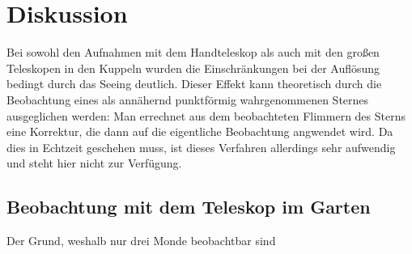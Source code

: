 \section{Diskussion}
Bei sowohl den Aufnahmen mit dem Handteleskop als auch mit den großen Teleskopen in den Kuppeln wurden die Einschränkungen bei der Auflösung bedingt durch das Seeing deutlich. Dieser Effekt kann theoretisch durch die Beobachtung eines als annähernd punktförmig wahrgenommenen Sternes ausgeglichen werden: Man errechnet aus dem beobachteten Flimmern des Sterns eine Korrektur, die dann auf die eigentliche Beobachtung angwendet wird. Da dies in Echtzeit geschehen muss, ist dieses Verfahren allerdings sehr aufwendig und steht hier nicht zur Verfügung. 

\subsection{Beobachtung mit dem Teleskop im Garten}
Der Grund, weshalb nur drei Monde beobachtbar sind